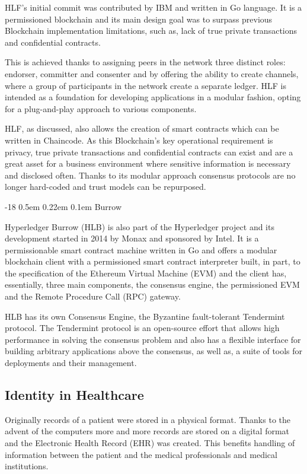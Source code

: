 \documentclass[]{llncs}
\makeatletter
\renewcommand\subsubsection{\@startsection{subsubsection}{3}{\z@}%
                       {-18\p@ \@plus -4\p@ \@minus -4\p@}%
                       {0.5em \@plus 0.22em \@minus 0.1em}%
                       {\normalfont\normalsize\bfseries\boldmath}}
\makeatother
\begin{document}
HLF’s initial commit was contributed by IBM and written in Go language. 
It is a permissioned blockchain and its main design goal was to surpass previous 
Blockchain implementation limitations, such as, lack of true private transactions 
and confidential contracts.

This is achieved thanks to assigning peers in the network three distinct roles: 
endorser, committer and consenter and by offering the ability to create channels, 
where a group of participants in the network create a separate ledger. 
HLF is intended as a foundation for developing applications in a modular fashion, 
opting for a plug-and-play approach to various components. \cite{HyperledgerFabricDocs2017}

HLF, as discussed, also allows the creation of smart contracts which can be written in Chaincode. 
As this Blockchain's key operational requirement is privacy, true private transactions 
and confidential contracts can exist and are a great asset for a business environment 
where sensitive information is necessary and disclosed often. 
Thanks to its modular approach consensus protocols are no longer hard-coded and 
trust models can be repurposed.

\subsubsection{Burrow}

Hyperledger Burrow (HLB) is also part of the Hyperledger project and its development 
started in 2014 by Monax and sponsored by Intel. It is a permissionable smart contract machine 
written in Go and offers a modular blockchain client with a permissioned smart contract interpreter 
built, in part, to the specification of the Ethereum Virtual Machine (EVM) and the client has, 
essentially, three main components, the consensus engine, the permissioned EVM and the 
Remote Procedure Call (RPC) gateway.
\cite{Kuhlman2017,HyperledgerBurrow2017}

HLB has its own Consensus Engine, the Byzantine fault-tolerant Tendermint protocol. 
The Tendermint protocol is an open-source effort that allows high performance in 
solving the consensus problem and also has a flexible interface for building 
arbitrary applications above the consensus, as well as, a suite of tools for 
deployments and their management. \cite{Buchman2016}
%

\subsection{Identity in Healthcare}
Originally records of a patient were stored in a physical format. 
Thanks to the advent of the computers more and more records are stored on a 
digital format and the Electronic Health Record (EHR) was created. 
This benefits handling of information between the patient 
and the medical professionals and medical institutions.
\end{document}
